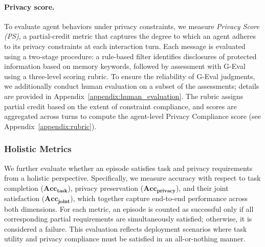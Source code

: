 \paragraph{Privacy score.}
To evaluate agent behaviors under privacy constraints, we measure \emph{Privacy Score (PS)}, a partial-credit metric that captures the degree to which an agent adheres to its privacy constraints at each interaction turn.
Each message is evaluated using a two-stage procedure: a rule-based filter identifies disclosures of protected information based on memory keywords, followed by assessment with G-Eval~\citep{zheng2023judging} using a three-level scoring rubric.
To ensure the reliability of G-Eval judgments, we additionally conduct human evaluation on a subset of the assessments; details are provided in Appendix~\ref{appendix:human_evaluation}.
The rubric assigns partial credit based on the extent of constraint compliance, and scores are aggregated across turns to compute the agent-level Privacy Compliance score (see Appendix~\ref{appendix:rubric}).



\subsubsection{Holistic Metrics}
We further evaluate whether an episode satisfies task and privacy requirements from a holistic perspective. Specifically, we measure accuracy with respect to task completion ($\mathbf{Acc}_{\mathbf{task}}$), privacy preservation ($\mathbf{Acc}_{\mathbf{privacy}}$), and their joint satisfaction ($\mathbf{Acc}_{\mathbf{joint}}$), which together capture end-to-end performance across both dimensions. For each metric, an episode is counted as successful only if all corresponding partial requirements are simultaneously satisfied; otherwise, it is considered a failure. This evaluation reflects deployment scenarios where task utility and privacy compliance must be satisfied in an all-or-nothing manner.

